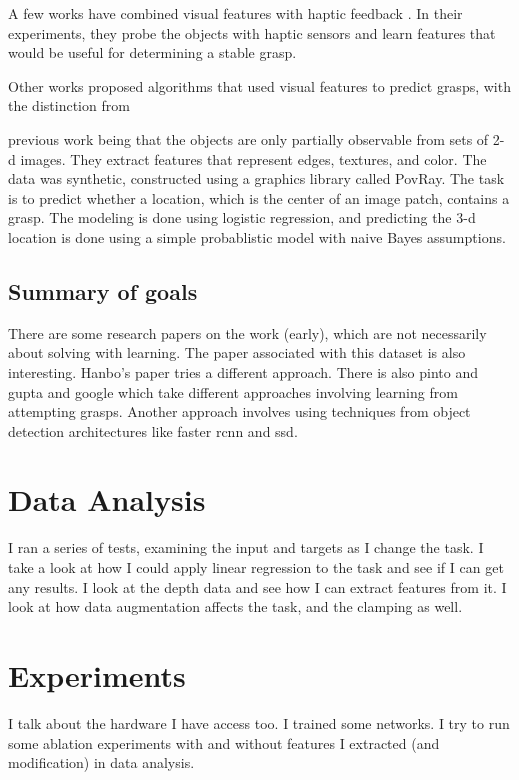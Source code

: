 \documentclass{article}
\begin{document}
A few works have combined visual features with haptic feedback
\cite{coelho01,piater02}. In their experiments, they probe the objects with
haptic sensors and learn features that would be useful for determining a
stable grasp.

Other works \cite{saxena07,saxena08,saxena08a} proposed
algorithms that used visual features to predict grasps, with the distinction from

previous work being that the objects are only partially observable from sets of
2-d images. They extract features that represent edges, textures, and color.
The data was synthetic, constructed using a graphics library called PovRay.
The task is to predict whether a location, which is the center of an image patch,
contains a grasp. The modeling is done using logistic regression, and predicting
the 3-d location is done using a simple probablistic model with naive Bayes
assumptions.

\subsection{Summary of goals}
There are some research papers on the work (early), which are not necessarily
about solving with learning.
The paper associated with
this dataset is also interesting. Hanbo's paper tries a different approach.
There is also pinto and gupta and google which take different approaches
involving learning from attempting grasps. Another approach involves using
techniques from object detection architectures like faster rcnn and ssd.


\section{Data Analysis}
I ran a series of tests, examining the input and targets as I change the task.
I take a look at how I could apply linear regression to the task and see if
I can get any results. I look at the depth data and see how I can extract
features from it. I look at how data augmentation affects the task, and the
clamping as well.

\section{Experiments}
I talk about the hardware I have access too. I trained some networks. I try
to run some ablation experiments with and without features I extracted (and
modification) in data analysis.



\end{document}
